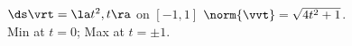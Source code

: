 {$\ds \vrt = \la t^2,t \ra$ on $[-1,1]$
}
{
$\norm{\vvt} = \sqrt{4t^2+1}$. \\
Min at $t=0$; Max at $t=\pm 1$. 
}